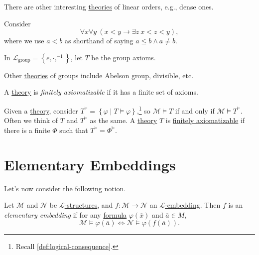 There are other interesting \hyperref[def:theory]{theories} of linear orders, e.g., dense ones.

\begin{eg}
	Consider
	\[
		\forall x \forall y\ (x < y \to  \exists z\ x < z < y),
	\]
	where we use \(a < b\) as shorthand of saying \(a \leq b \land a \neq b\).
\end{eg}

\begin{eg}[Group]
	In \(\mathcal{L} _{\text{group} } = \left\{ e, \cdot, ^{-1}  \right\} \), let \(T\) be the group axioms.
\end{eg}

Other \hyperref[def:theory]{theories} of groups include Abelson group, divisible, etc.

\begin{definition}\label{def:finitely-axiomatizable}
	A \hyperref[def:theory]{theory} is \emph{finitely axiomatizable} if it has a finite set of axioms.
\end{definition}

Given a \hyperref[def:theory]{theory}, consider \(T^{\models } = \left\{ \varphi \mid T \models \varphi \right\}\),\footnote{Recall \autoref{def:logical-consequence}.} so \(\mathcal{M} \models T\) if and only if \(\mathcal{M} \models T^{\models }\). Often we think of \(T\) and \(T^{\models }\) as the same. A \hyperref[def:theory]{theory} \(T\) is \hyperref[def:finitely-axiomatizable]{finitely axiomatizable} if there is a finite \(\Phi \) such that \(T^{\models } = \Phi ^{\models }\).

\section{Elementary Embeddings}
Let's now consider the following notion.

\begin{definition}\label{def:elementary-embedding}
	Let \(\mathcal{M} \) and \(\mathcal{N} \) be \hyperref[def:structure]{\(\mathcal{L} \)-structures}, and \(f\colon \mathcal{M} \to \mathcal{N} \) an \hyperref[def:embedding]{\(\mathcal{L} \)-embedding}. Then \(f\) is an \emph{elementary embedding} if for any \hyperref[def:formula]{formula} \(\varphi (\overline{x} )\) and \(\overline{a} \in M\),
	\[
		\mathcal{M} \models \varphi (\overline{a} )\iff \mathcal{N} \models \varphi (f(\overline{a} )).
	\]
\end{definition}

